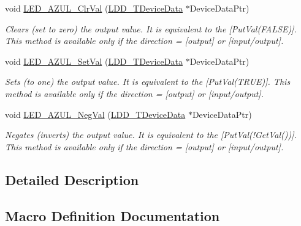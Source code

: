 \begin{DoxyCompactItemize}
void \hyperlink{group___l_e_d___a_z_u_l__module_ga8c31c6eb2cbf29c6a21e6699aac2bdfa}{L\+E\+D\+\_\+\+A\+Z\+U\+L\+\_\+\+Clr\+Val} (\hyperlink{group___p_e___types__module_gac5cf1362f1f0e3a2ce71b1bf2276d091}{L\+D\+D\+\_\+\+T\+Device\+Data} $\ast$Device\+Data\+Ptr)
\begin{DoxyCompactList}\small\item\em Clears (set to zero) the output value. It is equivalent to the \mbox{[}Put\+Val(\+F\+A\+L\+S\+E)\mbox{]}. This method is available only if the direction = {\itshape \mbox{[}output\mbox{]}} or {\itshape \mbox{[}input/output\mbox{]}}. \end{DoxyCompactList}\item 
void \hyperlink{group___l_e_d___a_z_u_l__module_gaffe62e7fc5b9c58598c7ded84f73acc6}{L\+E\+D\+\_\+\+A\+Z\+U\+L\+\_\+\+Set\+Val} (\hyperlink{group___p_e___types__module_gac5cf1362f1f0e3a2ce71b1bf2276d091}{L\+D\+D\+\_\+\+T\+Device\+Data} $\ast$Device\+Data\+Ptr)
\begin{DoxyCompactList}\small\item\em Sets (to one) the output value. It is equivalent to the \mbox{[}Put\+Val(\+T\+R\+U\+E)\mbox{]}. This method is available only if the direction = {\itshape \mbox{[}output\mbox{]}} or {\itshape \mbox{[}input/output\mbox{]}}. \end{DoxyCompactList}\item 
void \hyperlink{group___l_e_d___a_z_u_l__module_ga6d91752ad9205b956044a0212084022d}{L\+E\+D\+\_\+\+A\+Z\+U\+L\+\_\+\+Neg\+Val} (\hyperlink{group___p_e___types__module_gac5cf1362f1f0e3a2ce71b1bf2276d091}{L\+D\+D\+\_\+\+T\+Device\+Data} $\ast$Device\+Data\+Ptr)
\begin{DoxyCompactList}\small\item\em Negates (inverts) the output value. It is equivalent to the \mbox{[}Put\+Val(!\+Get\+Val())\mbox{]}. This method is available only if the direction = {\itshape \mbox{[}output\mbox{]}} or {\itshape \mbox{[}input/output\mbox{]}}. \end{DoxyCompactList}\end{DoxyCompactItemize}


\subsection{Detailed Description}


\subsection{Macro Definition Documentation}
